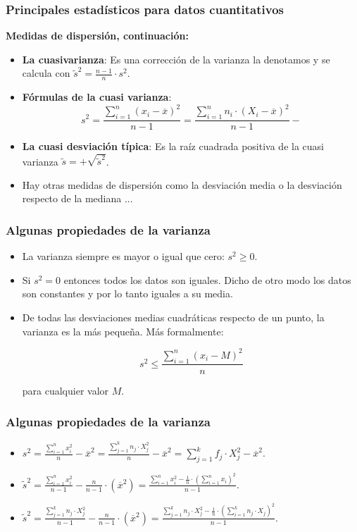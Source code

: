 \begin{frame}
\frametitle{Principales estadísticos para datos cuantitativos}
\textbf{Medidas de dispersión, continuación:}
\begin{itemize}
\item \textbf{La cuasivarianza}: Es una corrección de la varianza la denotamos y se calcula  con  $\tilde{s}^2 =
\frac{n-1}{n} \cdot s^2.$
\item \textbf{Fórmulas de la cuasi varianza}:
 $$s^2=\frac{\sum_{i=1}^n (x_i-\overline{x})^2}{n-1}=\frac{\sum_{i=1}^n n_i\cdot (X_i-\overline{x})^2}{n-1}-$$
\item \textbf{La cuasi desviación típica}: Es la raíz cuadrada positiva de la cuasi varianza $\tilde{s}=+\sqrt{\tilde{s}^2}$.
\item Hay otras medidas de dispersión como la desviación media o la desviación respecto de la mediana ...
\end{itemize}
\end{frame}


\begin{frame}
\frametitle{Algunas propiedades de la varianza}

\begin{itemize}
\item La varianza siempre es mayor o igual que cero: $s^2\geq 0$.
\item Si $s^2=0$ entonces todos los datos son iguales. Dicho de otro modo los datos son constantes y por lo tanto
 iguales a su media.
\item De todas las desviaciones medias  cuadráticas respecto  de un punto, la varianza es la más pequeña. Más formalmente:

$$s^ 2 \leq \frac{\sum_{i=1}^n (x_i- M)^ 2}{n}$$


para cualquier valor $M$.

\end{itemize}
\end{frame}

\begin{frame}
\frametitle{Algunas propiedades de la varianza}

\begin{itemize}
\item $s^2= \frac{\sum_{i=1}^n x_i^2}{n}-\overline{x}^2=\frac{\sum_{j=1}^k n_j\cdot X_j^2}{n}-\overline{x}^2=\sum_{j=1}^k f_j \cdot X_j^2-\overline{x}^2.$
\item $\tilde{s}^2=\frac{\sum_{i=1}^n x_i^2}{n-1}-\frac{n}{n-1}\cdot \left(\overline{x}^2 \right)=\frac{\sum_{i=1}^n x_i^2- \frac{1}{n}\cdot \left(\sum_{i=1}^n x_i\right)^2}{n-1}.$
\item $\tilde{s}^2=\frac{\sum_{j=1}^k n_j\cdot  X_j^2}{n-1}-\frac{n}{n-1}\cdot \left(\overline{x}^2 \right)=\frac{\sum_{j=1}^k
n_j\cdot X_j^2- \frac{1}{n} \cdot \left(\sum_{i=1}^k n_j\cdot X_j\right)^2}{n-1}.$
\end{itemize}
\end{frame}

